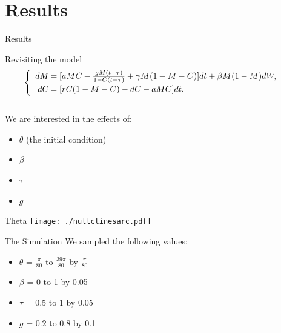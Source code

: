
\section{Results}

\begin{frame}{Results}
  
  Revisiting the model
  $$\begin{cases}
    \begin{array}{rl}
      dM\hspace{-.8em}&=[aMC - \frac{gM(t-\tau)}{1-C(t-\tau)} + \gamma M (1-M-C)]dt+\beta M(1-M)dW,\\
      dC\hspace{-.8em}&=[rC(1-M-C) - dC - aMC]dt.\\
    \end{array}
    \end{cases}$$\\
  We are interested in the effects of:
  \begin{itemize}
  \item $\theta$ (the initial condition)\\
  \item $\beta$\\
  \item $\tau$\\
  \item $g$\\
  \end{itemize}
  
  

\end{frame}

\begin{frame}{Theta}
\texttt{[image: ./nullclinesarc.pdf]}

\end{frame}

\begin{frame}{The Simulation}
We sampled the following values:
\begin{itemize}
\item $\theta$ = $\frac{\pi}{80}$ to $\frac{39\pi}{80}$ by $\frac{\pi}{80}$\\
\item $\beta$ = 0 to 1 by 0.05\\
\item $\tau$ = 0.5 to 1 by 0.05\\
\item $g$ = 0.2 to 0.8 by 0.1\\
\end{itemize}
\end{frame}

